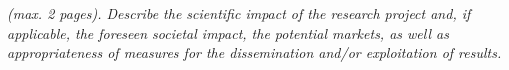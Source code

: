 %
% 
%
%

\emph{(max. 2 pages). Describe the scientific impact of the research project and, if applicable, the foreseen societal impact, the potential markets, as well as appropriateness of measures for the dissemination and/or exploitation of results.}  





% 
